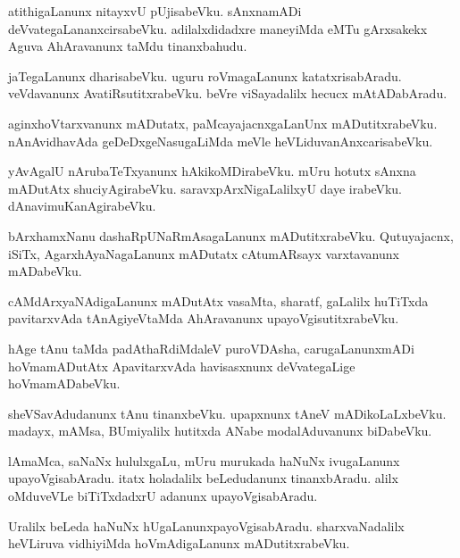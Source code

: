 \documentclass{article}
\begin{document}
\begin{mn}
atithigaLanunx nitayxvU pUjisabeVku. sAnxnamADi deVvategaLananxcirsabeVku. adilalxdidadxre 
maneyiMda eMTu gArxsakekx Aguva AhAravanunx taMdu tinanxbahudu. 
\end{mn}

\begin{mn}
jaTegaLanunx dharisabeVku. uguru roVmagaLanunx katatxrisabAradu. veVdavanunx AvatiRsutitxrabeVku. 
beVre viSayadalilx hecucx mAtADabAradu.
\end{mn}

\begin{mn}
aginxhoVtarxvanunx mADutatx, paMcayajacnxgaLanUnx mADutitxrabeVku. nAnAvidhavAda 
geDeDxgeNasugaLiMda meVle heVLiduvanAnxcarisabeVku.
\end{mn}

\begin{mn}
yAvAgalU nArubaTeTxyanunx hAkikoMDirabeVku. mUru hotutx sAnxna mADutAtx shuciyAgirabeVku. 
saravxpArxNigaLalilxyU daye irabeVku. dAnavimuKanAgirabeVku.
\end{mn}

\begin{mn}
bArxhamxNanu dashaRpUNaRmAsagaLanunx mADutitxrabeVku. Qutuyajacnx, iSiTx, AgarxhAyaNagaLanunx 
mADutatx cAtumARsayx varxtavanunx mADabeVku.
\end{mn}

\begin{mn}
cAMdArxyaNAdigaLanunx mADutAtx vasaMta, sharatf, gaLalilx  huTiTxda pavitarxvAda tAnAgiyeVtaMda 
AhAravanunx upayoVgisutitxrabeVku.
\end{mn}

\begin{mn}
hAge tAnu taMda padAthaRdiMdaleV puroVDAsha, carugaLanunxmADi hoVmamADutAtx ApavitarxvAda 
havisasxnunx deVvategaLige hoVmamADabeVku.
\end{mn}

\begin{mn}
sheVSavAdudanunx tAnu tinanxbeVku. upapxnunx tAneV mADikoLaLxbeVku. madayx, mAMsa, BUmiyalilx 
hutitxda ANabe modalAduvanunx biDabeVku.
\end{mn}

\begin{mn}
lAmaMca, saNaNx hululxgaLu, mUru murukada haNuNx ivugaLanunx upayoVgisabAradu. itatx holadalilx 
beLedudanunx tinanxbAradu. alilx oMduveVLe biTiTxdadxrU adanunx upayoVgisabAradu.
\end{mn}

\begin{mn}
Uralilx beLeda haNuNx hUgaLanunxpayoVgisabAradu. sharxvaNadalilx heVLiruva vidhiyiMda 
hoVmAdigaLanunx mADutitxrabeVku.
\end{mn}
\end{document}
